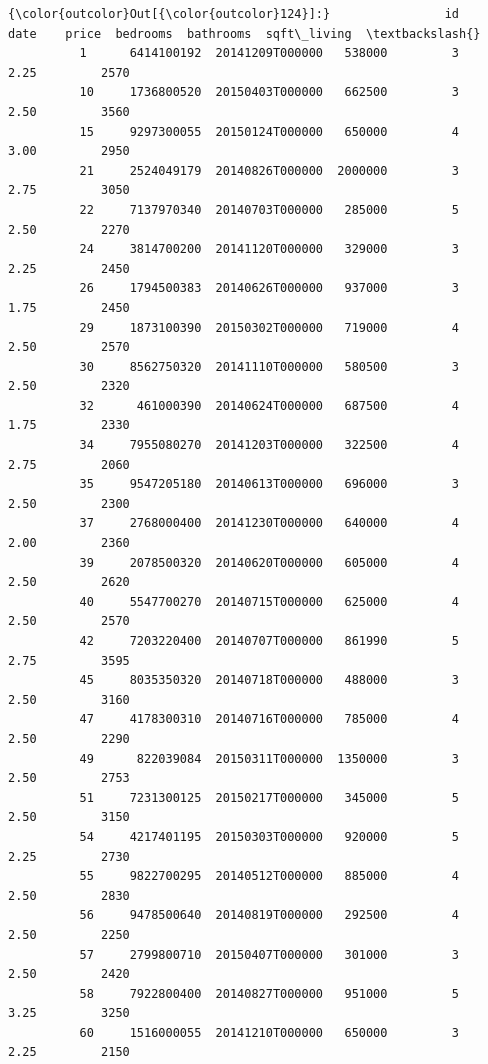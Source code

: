 \documentclass[11pt]{article}
\begin{document}
\begin{Verbatim}[commandchars=\\\{\}]
{\color{outcolor}Out[{\color{outcolor}124}]:}                id             date    price  bedrooms  bathrooms  sqft\_living  \textbackslash{}
          1      6414100192  20141209T000000   538000         3       2.25         2570   
          10     1736800520  20150403T000000   662500         3       2.50         3560   
          15     9297300055  20150124T000000   650000         4       3.00         2950   
          21     2524049179  20140826T000000  2000000         3       2.75         3050   
          22     7137970340  20140703T000000   285000         5       2.50         2270   
          24     3814700200  20141120T000000   329000         3       2.25         2450   
          26     1794500383  20140626T000000   937000         3       1.75         2450   
          29     1873100390  20150302T000000   719000         4       2.50         2570   
          30     8562750320  20141110T000000   580500         3       2.50         2320   
          32      461000390  20140624T000000   687500         4       1.75         2330   
          34     7955080270  20141203T000000   322500         4       2.75         2060   
          35     9547205180  20140613T000000   696000         3       2.50         2300   
          37     2768000400  20141230T000000   640000         4       2.00         2360   
          39     2078500320  20140620T000000   605000         4       2.50         2620   
          40     5547700270  20140715T000000   625000         4       2.50         2570   
          42     7203220400  20140707T000000   861990         5       2.75         3595   
          45     8035350320  20140718T000000   488000         3       2.50         3160   
          47     4178300310  20140716T000000   785000         4       2.50         2290   
          49      822039084  20150311T000000  1350000         3       2.50         2753   
          51     7231300125  20150217T000000   345000         5       2.50         3150   
          54     4217401195  20150303T000000   920000         5       2.25         2730   
          55     9822700295  20140512T000000   885000         4       2.50         2830   
          56     9478500640  20140819T000000   292500         4       2.50         2250   
          57     2799800710  20150407T000000   301000         3       2.50         2420   
          58     7922800400  20140827T000000   951000         5       3.25         3250   
          60     1516000055  20141210T000000   650000         3       2.25         2150   

\end{Verbatim}
\end{document}
